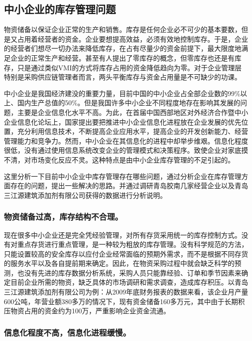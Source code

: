 \subsection {中小企业的库存管理问题}

    物资储备以保证企业正常的生产和销售。库存是任何企业必不可少的基本要数，但是又占用着经营者的资金。企业要想提高效益，必须有效地控制库存。于是，企业的经营者们想尽一切办法来降低库存，在占有尽量少的资金前提下，最大限度地满足企业的正常生产和经营。甚至有人提出了零库存的概念，但零库存也还是有库存，只是通过类似VMI的方式将库存占用的资金降低趋向为零。对于企业管理层特别是采购供应链管理者而言，两头平衡库存与资金占用量是不可缺少的功课。

    中小企业是我国经济建没的重要力量，目前中国的中小企业占全部企业数的99\%以上、国内生产总值的50\%。但是我国许多中小企业不同程度地存在影响其发展的问题，主要是企业信息化水平不高。为此，在首届中国西部地区对外经济合作暨中小企业信息化论坛上，国家提出要把推进中小企业信息化进程放在企业发展的优先位置，充分利用信息技术，不断提高企业应用水平，提高企业的开发创新能力、经营管理能力和竞争力。然而，中小企业在其信息化的进程中却举步维艰。信息化程度很低，没有通过使用信息系统改变企业的管理模式和决策程序。致使企业对家底摸不清，对市场变化反应不灵。这种特点是由中小企业库存管理的不足引起的。

    这里分析一下目前中小企业中库存管理存在哪些问题，通过分析企业在库存管理方面存在的问题，提出一些解决的思路。并通过调研青岛胶南几家经营企业以及青岛三江源建筑添加剂有限公司获得的数据进行分析说明。

    \subsubsection { 物资储备过高，库存结构不合理。}

    现在很多中小企业还是完全凭经验管理，对所有存货采用统一的库存控制方式。没有对重点存货进行重点管理，是一种较为粗放的库存管理。没有科学规范的方法，只能设置较高的安全库存以应付企业经常面临的预期外需求，而不是根据不同存货的服务水平以及各自提前期来确定。因此，在物资采购过程中就会缺乏科学的预测，也没有先进的库存数据分析系统，采购人员只能靠经验、订单和季节因素来确定目前企业所需的物资，缺乏具体的市场调研和需求调查，造成库存积压。以青岛三江源建筑添加剂有限公司为例：从2009年底财务报表的数据来看，该企业月产量600公吨，年营业额380多万的情况下，现有资金储备160多万元，其中由于长期积压物资占用的资金约为100万，严重影响企业资金流通。

    \subsubsection { 信息化程度不高，信息化进程缓慢。}

